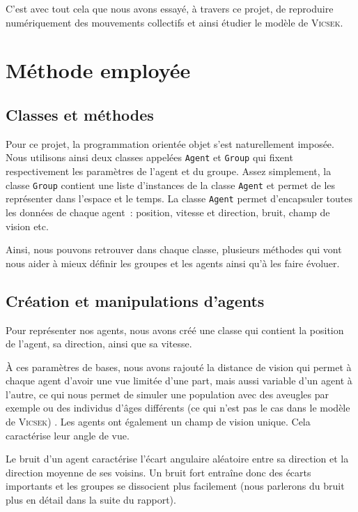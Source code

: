 \documentclass[french, a4paper, 12pt, openany]{report}
\begin{document}
	C'est avec tout cela que nous avons essayé, à travers ce projet, de reproduire numériquement des mouvements collectifs et ainsi étudier le modèle de \textsc{Vicsek}.\\
	
	
		
\chapter{Méthode employée}
\section{Classes et méthodes}

    Pour ce projet, la programmation orientée objet s'est naturellement imposée. Nous utilisons ainsi deux classes appelées \verb|Agent| et \verb|Group| qui fixent respectivement les paramètres de l'agent et du groupe. Assez simplement, la classe \verb|Group| contient une liste d'instances de la classe \verb|Agent| et permet de les représenter dans l'espace et le temps. La classe \verb|Agent| permet d'encapsuler toutes les données de chaque agent~: position, vitesse et direction, bruit, champ de vision etc.
    
	Ainsi, nous pouvons retrouver dans chaque classe, plusieurs méthodes qui vont nous aider à mieux définir les groupes et les agents ainsi qu'à les faire évoluer. \\
  
\section{Création et manipulations d'agents}
	Pour représenter nos agents, nous avons créé une classe qui contient la position de l'agent, sa direction, ainsi que sa vitesse.
	
	À ces paramètres de bases, nous avons rajouté la distance de vision qui permet à chaque agent d'avoir une vue limitée d'une part, mais aussi variable d'un agent à l'autre, ce qui nous permet de simuler une population avec des aveugles par exemple ou des individus d'âges différents (ce qui n'est pas le cas dans le modèle de \textsc{Vicsek}) . Les agents ont également un champ de vision unique. Cela caractérise leur angle de vue.  
	
	Le bruit d'un agent caractérise l'écart angulaire aléatoire entre sa direction et la direction moyenne de ses voisins. Un bruit fort entraîne donc des écarts importants et les groupes se dissocient plus facilement (nous parlerons du bruit plus en détail dans la suite du rapport).
	
\end{document}
